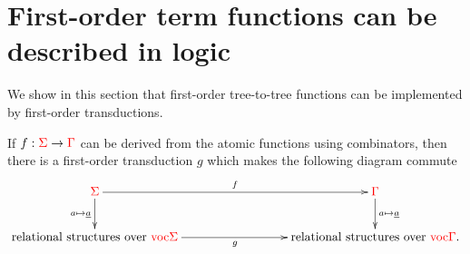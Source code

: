 
\section{First-order term functions can be described in logic}
\label{sec:to-logic}
We show in this section that first-order tree-to-tree functions can be implemented by first-order transductions.

\begin{proposition}\label{prop:to-logic} If $f : {\color{red}{\Sigma}} \to {\color{red}{\Gamma}}$ can be derived from the atomic functions using combinators, then there is a first-order transduction $g$ 
    which makes the following diagram commute
    \begin{align*}
        \xymatrix@C=3cm{
            \rSigma \ar[d]_{a \mapsto \underline a}\ar[r]^f &  \rGamma \ar[d]^{a \mapsto \underline a} \\
            \text{relational structures over $\voctype \rSigma$} \ar[r]_g &  \text{relational structures over $\voctype \rGamma$}.
        } 
    \end{align*}    
\end{proposition}
    
